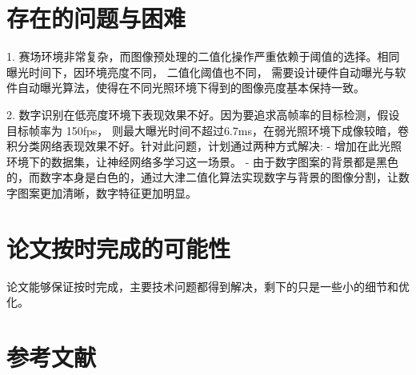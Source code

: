 \section{存在的问题与困难}
1. 赛场环境非常复杂，而图像预处理的二值化操作严重依赖于阈值的选择。相同曝光时间下，因环境亮度不同， 二值化阈值也不同，
需要设计硬件自动曝光与软件自动曝光算法，使得在不同光照环境下得到的图像亮度基本保持一致。\par

2. 数字识别在低亮度环境下表现效果不好。因为要追求高帧率的目标检测，假设目标帧率为 150fps，
则最大曝光时间不超过6.7ms，在弱光照环境下成像较暗，卷积分类网络表现效果不好。针对此问题，计划通过两种方式解决:
- 增加在此光照环境下的数据集，让神经网络多学习这一场景。
- 由于数字图案的背景都是黑色的，而数字本身是白色的，通过大津二值化算法实现数字与背景的图像分割，让数字图案更加清晰，数字特征更加明显。\par
\section{论文按时完成的可能性}
论文能够保证按时完成，主要技术问题都得到解决，剩下的只是一些小的细节和优化。\par
\section{参考文献}



